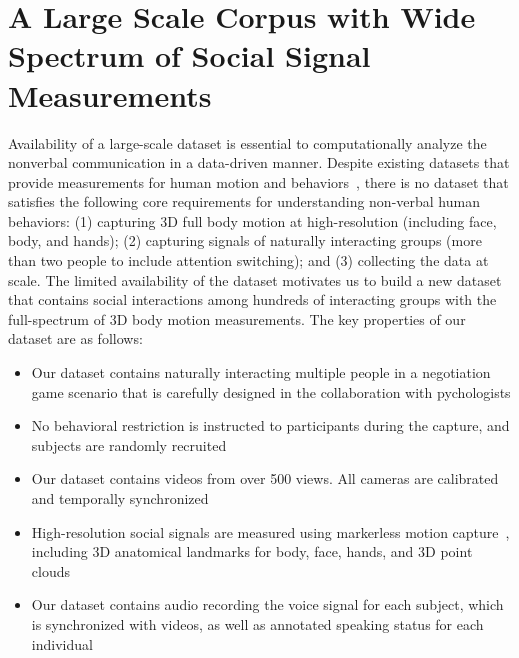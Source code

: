 
\chapter{A Large Scale Corpus with Wide Spectrum of Social Signal Measurements}
\label{chapter:dataset}
Availability of a large-scale dataset is essential to computationally analyze the nonverbal communication in a data-driven manner. Despite existing datasets that provide measurements for human motion and behaviors~\cite{carletta2005ami, Lepri-12, Zen-10,Cristani-11, SALSA-15, h36m_pami}, there is no dataset that satisfies the following core requirements for understanding non-verbal human behaviors: (1) capturing 3D full body motion at high-resolution (including face, body, and hands); (2) capturing signals of naturally interacting groups (more than two people to include attention switching); and (3) collecting the data at scale. The limited availability of the dataset motivates us to build a new dataset that contains social interactions among hundreds of interacting groups with the full-spectrum of 3D body motion measurements. The key properties of our dataset are as follows:
\begin{itemize}
	\item Our dataset contains naturally interacting multiple people in a negotiation game scenario that is carefully designed in the collaboration with pychologists
	\item No behavioral restriction is instructed to participants during the capture, and subjects are randomly recruited
	\item Our dataset contains videos from over 500 views. All cameras are calibrated and temporally synchronized
	\item High-resolution social signals are measured using markerless motion capture~\cite{joo2017panoptic, joo2018}, including 3D anatomical landmarks for body, face, hands, and 3D point clouds
	\item Our dataset contains audio recording the voice signal for each subject, which is synchronized with videos, as well as annotated speaking status for each individual
\end{itemize}

